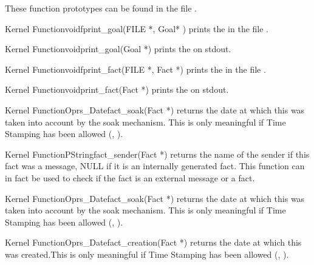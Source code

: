 These function prototypes can be found in the file
.

\begin{typefn}{Kernel Function}{void}{fprint\_goal}{(FILE *, Goal*
)}
prints the  in the file .
\end{typefn}

\begin{typefn}{Kernel Function}{void}{print\_goal}{(Goal *)}
prints the  on stdout.
\end{typefn}

\begin{typefn}{Kernel Function}{void}{fprint\_fact}{(FILE *, Fact
*)}
prints the  in the file .
\end{typefn}

\begin{typefn}{Kernel Function}{void}{print\_fact}{(Fact *)}
prints the  on stdout.
\end{typefn}

\begin{typefn}{Kernel Function}{Oprs\_Date}{fact\_soak}{(Fact *)}
returns the date at which this  was taken into account by
the soak mechanism. This is only meaningful if Time Stamping has been allowed
(, ). 
\end{typefn}

\begin{typefn}{Kernel Function}{PString}{fact\_sender}{(Fact *)}
returns the name of the sender if this fact was a message, NULL if it is an
internally generated fact. This function can in fact be used to check if
the
fact is an external message or a fact.
\end{typefn}

\begin{typefn}{Kernel Function}{Oprs\_Date}{fact\_soak}{(Fact *)}
returns the date at which this  was taken into account by
the soak mechanism. This is only meaningful if Time Stamping has been allowed
(, ). 
\end{typefn}

\begin{typefn}{Kernel Function}{Oprs\_Date}{fact\_creation}{(Fact *)}
returns the date at which this  was created.This is only meaningful
if Time Stamping has been allowed 
(, ). 
\end{typefn}

